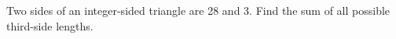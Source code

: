Two sides of an integer-sided triangle are 28 and 3. Find the sum of all possible third-side lengths.
